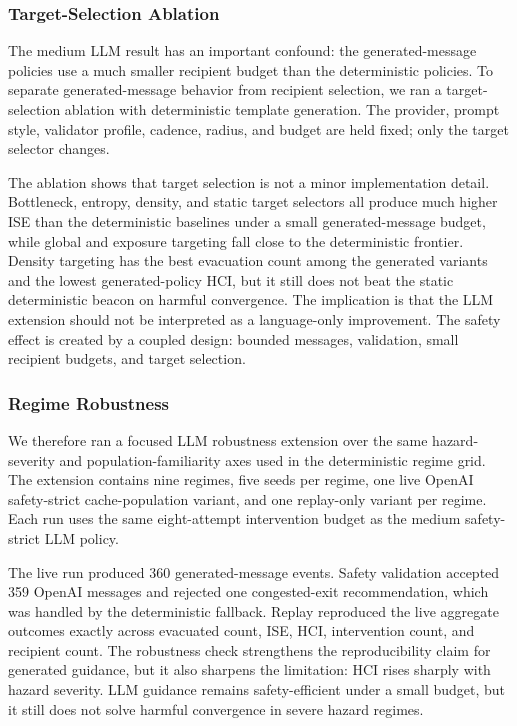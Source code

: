 \subsubsection{Target-Selection Ablation}
\label{subsec:llm-target-selection}

The medium LLM result has an important confound: the generated-message
policies use a much smaller recipient budget than the deterministic policies.
To separate generated-message behavior from recipient selection, we ran a
target-selection ablation with deterministic template generation. The provider,
prompt style, validator profile, cadence, radius, and budget are held fixed;
only the target selector changes.

\llmTargetSelectionTable

The ablation shows that target selection is not a minor implementation detail.
Bottleneck, entropy, density, and static target selectors all produce much
higher ISE than the deterministic baselines under a small generated-message
budget, while global and exposure targeting fall close to the deterministic
frontier. Density targeting has the best evacuation count among the generated
variants and the lowest generated-policy HCI, but it still does not beat the
static deterministic beacon on harmful convergence. The implication is that
the LLM extension should not be interpreted as a language-only improvement.
The safety effect is created by a coupled design: bounded messages, validation,
small recipient budgets, and target selection.

\subsubsection{Regime Robustness}
\label{subsec:llm-regime-robustness}

We therefore ran a focused LLM robustness extension over the same
hazard-severity and population-familiarity axes used in the deterministic
regime grid. The extension contains nine regimes, five seeds per regime, one
live OpenAI safety-strict cache-population variant, and one replay-only variant
per regime. Each run uses the same eight-attempt intervention budget as the
medium safety-strict LLM policy.

\llmRegimeTable

The live run produced 360 generated-message events. Safety validation accepted
359 OpenAI messages and rejected one congested-exit recommendation, which was
handled by the deterministic fallback. Replay reproduced the live aggregate
outcomes exactly across evacuated count, ISE, HCI, intervention count, and
recipient count. The robustness check strengthens the reproducibility claim
for generated guidance, but it also sharpens the limitation: HCI rises sharply
with hazard severity. LLM guidance remains safety-efficient under a small
budget, but it still does not solve harmful convergence in severe hazard
regimes.

